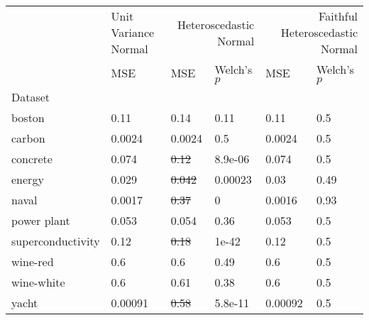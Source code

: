 \begin{tabular}{l|l|ll|ll}
\toprule
 & Unit Variance Normal & \multicolumn{2}{r}{Heteroscedastic Normal} & \multicolumn{2}{r}{Faithful Heteroscedastic Normal} \\
 & MSE & MSE & Welch's $p$ & MSE & Welch's $p$ \\
Dataset &  &  &  &  &  \\
\midrule
boston & 0.11 & 0.14 & 0.11 & 0.11 & 0.5 \\
carbon & 0.0024 & 0.0024 & 0.5 & 0.0024 & 0.5 \\
concrete & 0.074 & \sout{0.12} & 8.9e-06 & 0.074 & 0.5 \\
energy & 0.029 & \sout{0.042} & 0.00023 & 0.03 & 0.49 \\
naval & 0.0017 & \sout{0.37} & 0 & 0.0016 & 0.93 \\
power plant & 0.053 & 0.054 & 0.36 & 0.053 & 0.5 \\
superconductivity & 0.12 & \sout{0.18} & 1e-42 & 0.12 & 0.5 \\
wine-red & 0.6 & 0.6 & 0.49 & 0.6 & 0.5 \\
wine-white & 0.6 & 0.61 & 0.38 & 0.6 & 0.5 \\
yacht & 0.00091 & \sout{0.58} & 5.8e-11 & 0.00092 & 0.5 \\
\bottomrule
\end{tabular}
